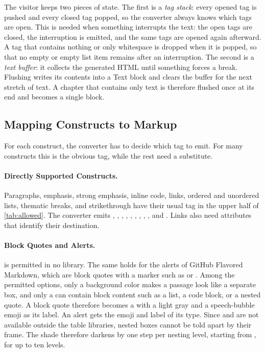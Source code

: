 The visitor keeps two pieces of state.
The first is a \emph{tag stack}: every opened tag is pushed and every closed tag popped, so the
converter always knows which tags are open.
This is needed when something interrupts the text: the open
tags are closed, the interruption is emitted, and the same tags are opened again afterward.
A tag that contains nothing or only whitespace is dropped when it is popped, so that no empty
 or empty list item remains after an interruption.
The second is a \emph{text buffer}: it collects the generated HTML until something forces a break.
Flushing writes its contents into a Text block and clears the buffer for the next stretch of text.
A chapter that contains only text is therefore flushed once at its end and becomes a single block.

\subsection{Mapping Constructs to Markup}
\label{sec:mk_easy}

For each construct, the converter has to decide which tag to emit.
For many constructs this is the obvious tag, while the rest need a substitute.

\paragraph{Directly Supported Constructs.}
Paragraphs, emphasis, strong emphasis, inline code, links, ordered and unordered lists, thematic
breaks, and strikethrough have their usual tag in the upper half of \autoref{tab:allowed}.
The converter emits , , , , , , ,
, , and .
Links also need attributes that identify their destination.

\paragraph{Block Quotes and Alerts.}
 is permitted in no library.
The same holds for the alerts of GitHub Flavored Markdown, which are block quotes with a marker such
as \code{[!NOTE]} or \code{[!WARNING]}.
Among the permitted options, only a background color makes a passage look like a separate box, and
only a  can contain block content such as a list, a code block, or a nested quote.
A block quote therefore becomes a  with a light gray  and a
speech-bubble emoji as its label.
An alert gets the emoji and label of its type.
Since  and  are not available outside the table libraries, nested boxes
cannot be told apart by their frame.
The shade therefore darkens by one step per nesting level, starting from , for up to
ten levels.

